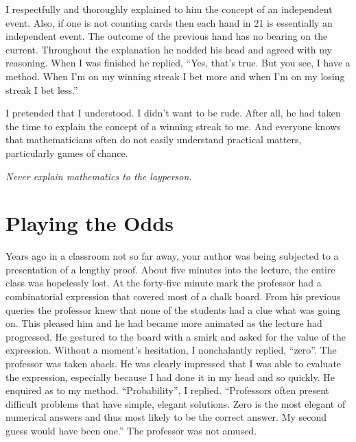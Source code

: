 I respectfully and thoroughly explained to him the concept of an independent
event.  Also, if one is not counting cards then each hand
in 21 is essentially an independent event.  The outcome of the previous
hand has no bearing on the current.  Throughout the explanation he nodded
his head and agreed with my reasoning.  When I was finished he replied,
``Yes, that's true.  But you see, I have a method.  When I'm on my winning
streak I bet more and when I'm on my losing streak I bet less.''  

I pretended
that I understood.  I didn't want to be rude.  After all, he had taken the 
time to explain the concept of a winning streak to me.  And everyone knows
that mathematicians often do not easily understand practical matters, 
particularly games of chance.

\textit{
  Never explain mathematics to the layperson.  
  }



\section{Playing the Odds}


Years ago in a classroom not so far away, your author was being subjected
to a presentation of a lengthy proof.   About five minutes into the 
lecture, the entire class was hopelessly lost.  At the forty-five minute
mark the professor had a combinatorial expression that covered most of
a chalk board.  From his previous queries the professor knew that none
of the students had a clue what was going on.  This pleased him and 
he had became more animated as the lecture had progressed.  He gestured
to the board with a smirk and asked for the value of the expression.
Without a moment's hesitation, I nonchalantly replied, ``zero''.  
The professor was taken aback.  He was clearly impressed that I was able
to evaluate the expression, especially because I had done it in my head
and so quickly.  He enquired as to my method.
``Probability'', I replied.  ``Professors often present difficult problems
that have simple, elegant solutions.  Zero is the most elegant of 
numerical answers and thus most likely to be the correct answer.  My second
guess would have been one.''  The professor was not amused.




